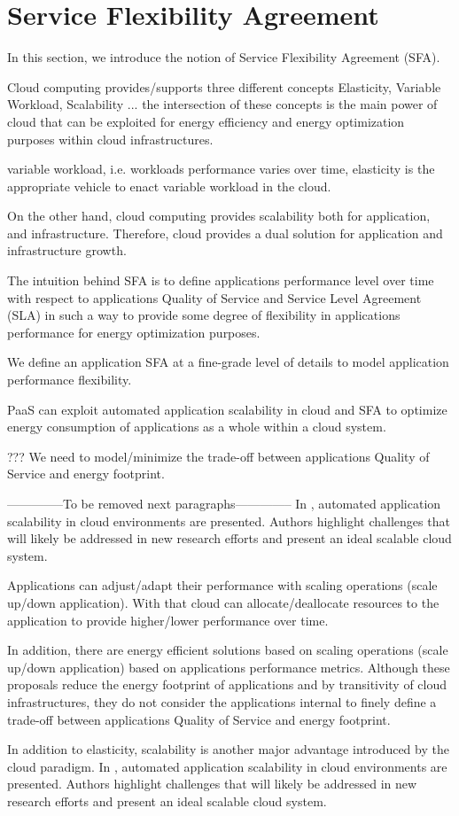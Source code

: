 \section{Service Flexibility Agreement}
In this section, we introduce the notion of Service Flexibility Agreement (SFA). 

Cloud computing provides/supports three different concepts Elasticity, Variable Workload, Scalability  ... the intersection of these concepts is the main power of cloud that can be exploited for energy efficiency and energy optimization purposes within cloud infrastructures.

variable workload, i.e. workloads performance varies over time, elasticity is the appropriate vehicle to enact variable workload in the cloud.

On the other hand, cloud computing provides scalability both for application, and infrastructure. Therefore, cloud provides a dual solution for application and infrastructure growth.

The intuition behind SFA is to define applications performance level over time with respect to applications Quality of Service and Service Level Agreement (SLA) in such a way to provide some degree of flexibility in applications performance for energy optimization purposes. 

We define an application SFA at a fine-grade level of details to model application performance flexibility.
 
PaaS can exploit automated application scalability in cloud and SFA to optimize energy consumption of applications as a whole within a cloud system.

???
We need to model/minimize the trade-off between applications Quality of Service and energy footprint.

--------------To be removed next paragraphs--------------
In \cite{vaquero_dynamically_2011}, automated application scalability in cloud environments are presented. Authors highlight challenges that will likely be addressed in new research efforts and present an ideal scalable cloud system.


Applications can adjust/adapt their performance with scaling operations (scale up/down application). With that cloud can allocate/deallocate resources to the application to provide higher/lower performance over time.

In addition, there are energy efficient solutions based on scaling operations (scale up/down application) based on applications performance metrics. Although these proposals reduce the energy footprint of applications and by transitivity of cloud infrastructures, they do not consider the applications internal to finely define a trade-off between applications Quality of Service and energy footprint.

In addition to elasticity, scalability is another major advantage introduced by the cloud paradigm. In \cite{vaquero_dynamically_2011}, automated application scalability in cloud environments are presented. Authors highlight challenges that will likely be addressed in new research efforts and present an ideal scalable cloud system.
